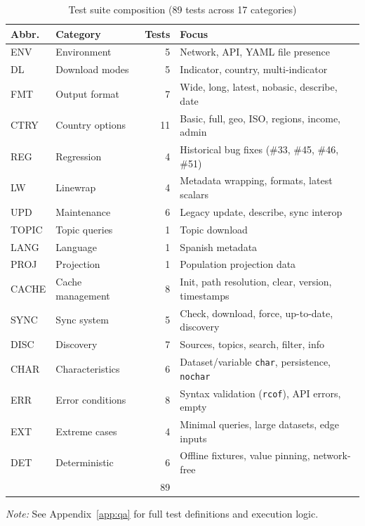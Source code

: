 \documentclass[bib]{statapress}
\newcommand{\floatnote}[2][\linewidth]{%
  \par\smallskip
  \begin{minipage}{#1}
    \small\raggedright #2
  \end{minipage}
}
\begin{document}
\begin{table}[H]
\centering
\caption{Test suite composition (89 tests across 17 categories)}
\label{tab:test-coverage}

\begin{tabular}{@{}llrl@{}}
\hline
Abbr. & Category & Tests & Focus \\
\hline
ENV   & Environment       & 5  & Network, API, YAML file presence \\
DL    & Download modes    & 5  & Indicator, country, multi-indicator \\
FMT   & Output format     & 7  & Wide, long, latest, nobasic, describe, date \\
CTRY  & Country options   & 11 & Basic, full, geo, ISO, regions, income, admin \\
REG   & Regression        & 4  & Historical bug fixes (\#33, \#45, \#46, \#51) \\
LW    & Linewrap          & 4  & Metadata wrapping, formats, latest scalars \\
UPD   & Maintenance       & 6  & Legacy update, describe, sync interop \\
TOPIC & Topic queries     & 1  & Topic download \\
LANG  & Language          & 1  & Spanish metadata \\
PROJ  & Projection        & 1  & Population projection data \\
CACHE & Cache management  & 8  & Init, path resolution, clear, version, timestamps \\
SYNC  & Sync system       & 5  & Check, download, force, up-to-date, discovery \\
DISC  & Discovery         & 7  & Sources, topics, search, filter, info \\
CHAR  & Characteristics   & 6  & Dataset/variable \texttt{char}, persistence, \texttt{nochar} \\
ERR   & Error conditions  & 8  & Syntax validation (\texttt{rcof}), API errors, empty \\
EXT   & Extreme cases     & 4  & Minimal queries, large datasets, edge inputs \\
DET   & Deterministic     & 6  & Offline fixtures, value pinning, network-free \\
\hline
      &                   & 89 & \\
\hline
\end{tabular}

\floatnote{\emph{Note:} See Appendix~\ref{app:qa} for full test definitions and execution logic.}

\end{table}
\end{document}
